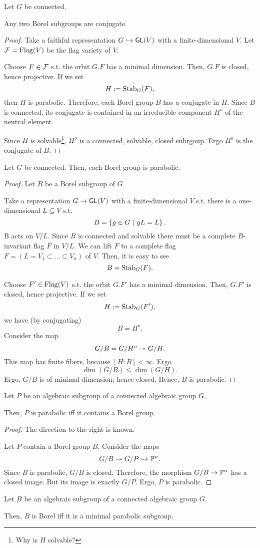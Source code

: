 \begin{theorem}
	Let $G$ be connected.
	 
	Any two Borel subgroups are conjugate.
\end{theorem}
\begin{proof}
Take a faithful representation $G \overset{}{\hookrightarrow} \textsf{GL}(V)$ with a finite-dimensional $V$. Let $\mathcal{F} = \mathrm{Flag}(V)$ be the flag variety of $V$.

Choose $F \in \mathcal{F}$ s.t. the orbit $G.F$ has a minimal dimension. Then, $G.F$ is closed, hence projective. If we set
\[ H:= \mathrm{Stab}_G(F), \]
then $H$ is parabolic. Therefore, each Borel group $B$ has a conjugate in $H$. Since $B$ is connected, its conjugate is contained in an irreducible component $H^o$ of the neutral element.

Since $H$ is solvable\footnote{Why is $H$ solvable?}, $H^o$ is a connected, solvable, closed subrgoup. Ergo $H^o$ is the conjugate of $B$.
\end{proof}
\begin{proposition}
Let $G$ be connected. Then, each Borel group is parabolic.
\end{proposition}
\begin{proof}
	Let $B$ be a Borel subgroup of $G$.
	
	Take a representation $G \overset{}{\rightarrow} \textsf{GL}(V)$ with a finite-dimensional $V$ s.t. there is a one-dimensional $L \subseteq V$ s.t.
	\[ B = \left\lbrace g \in G ~ | ~ gL = L\right\rbrace.\]
	B acts on $V/L$. Since $B$ is connected and solvable there must be a complete $B$-invariant flag $\overline{F}$ in $V/L$. We can lift $\overline{F}$ to a complete flag $F = (L=V_1 \subset \ldots \subset V_n)$ of $V$. Then, it is easy to see
	\[  B= \mathrm{Stab}_G(F). \]
	
	Choose $F' \in \mathrm{Flag}(V)$ s.t. the orbit $G.F'$ has a minimal dimension. Then, $G.F'$ is closed, hence projective. If we set
	\[ H:= \mathrm{Stab}_G(F'), \]
	we have (by conjugating)
	\[ B = H^o.\]
	Consider the map
	\[ G/B = G/H^o \overset{}{\twoheadrightarrow} G/H. \]
	This map has finite fibers, because $[H: B] < \infty$. Ergo
	\[ \dim(G / B) \leq \dim(G/H). \]
	Ergo, $G/B$ is of minimal dimension, hence closed. Hence, $B$ is parabolic.
\end{proof}
\begin{corollary}
	Let $P$ be an algebraic subgroup of a connected algebraic group $G$.
	
	Then, $P$ is parabolic iff it contains a Borel group.
\end{corollary}
\begin{proof}
	The direction to the right is known.
	
	Let $P$ contain a Borel group $B$. Consider the maps
	\[ G / B \overset{}{\twoheadrightarrow} G /P \overset{}{\hookrightarrow} \mathbb{P}^n. \]
	Since $B$ is parabolic, $G/B$ is closed. Therefore, the morphism $G / B \overset{}{\rightarrow} \mathbb{P}^n$ has a closed image. But its image is exactly $G/P$. Ergo, $P$ is parabolic.
\end{proof}
\begin{corollary}
	Let $B$ be an algebraic subgroup of a connected algebraic group $G$.
	
	Then, $B$ is Borel iff it is a minimal parabolic subgroup.
\end{corollary}